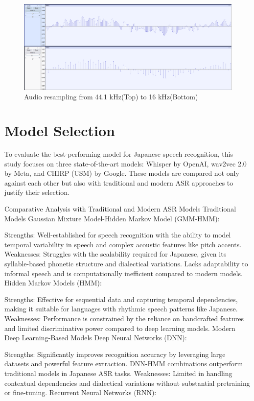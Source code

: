 \begin{figure}[H]
    \centering
    \includegraphics[width=1\textwidth]{mainmatter//images/bitrate.png}
    \caption{Audio resampling from 44.1 kHz(Top) to 16 kHz(Bottom)}
    \label{fig:resampling}
\end{figure}


\section{Model Selection}
To evaluate the best-performing model for Japanese speech recognition, this study focuses on three state-of-the-art models: Whisper by OpenAI, wav2vec 2.0 by Meta, and CHIRP (USM) by Google. These models are compared not only against each other but also with traditional and modern ASR approaches to justify their selection.

Comparative Analysis with Traditional and Modern ASR Models
Traditional Models
Gaussian Mixture Model-Hidden Markov Model (GMM-HMM):

Strengths: Well-established for speech recognition with the ability to model temporal variability in speech and complex acoustic features like pitch accents.
Weaknesses: Struggles with the scalability required for Japanese, given its syllable-based phonetic structure and dialectical variations. Lacks adaptability to informal speech and is computationally inefficient compared to modern models.
Hidden Markov Models (HMM):

Strengths: Effective for sequential data and capturing temporal dependencies, making it suitable for languages with rhythmic speech patterns like Japanese.
Weaknesses: Performance is constrained by the reliance on handcrafted features and limited discriminative power compared to deep learning models.
Modern Deep Learning-Based Models
Deep Neural Networks (DNN):

Strengths: Significantly improves recognition accuracy by leveraging large datasets and powerful feature extraction. DNN-HMM combinations outperform traditional models in Japanese ASR tasks.
Weaknesses: Limited in handling contextual dependencies and dialectical variations without substantial pretraining or fine-tuning.
Recurrent Neural Networks (RNN):

